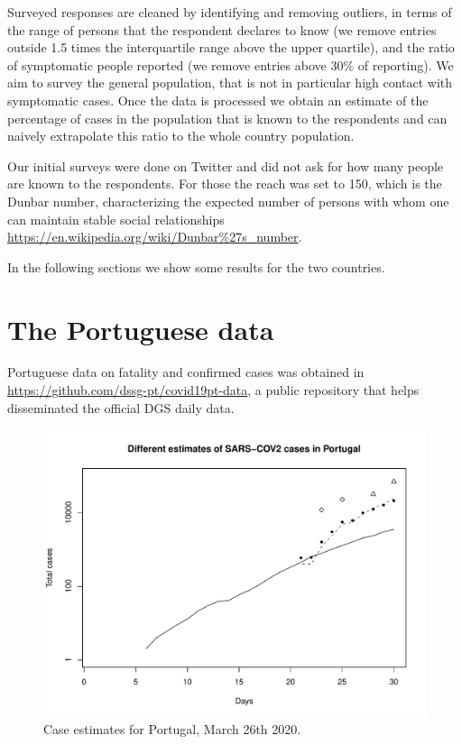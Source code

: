 \documentclass{article}
\begin{document}
Surveyed responses are cleaned by identifying and removing outliers, in terms of the range of persons that the respondent declares to know (we remove entries outside 1.5 times the interquartile range above the upper quartile), and the ratio of symptomatic people reported (we remove entries above $30\%$ of reporting). We aim to survey the general population, that is not in particular high contact with symptomatic cases. Once the data is processed we obtain an estimate of the percentage of cases in the population that is known to the respondents and can naively extrapolate this ratio to the whole country population. 


Our initial surveys were done on Twitter and did not ask for how many people are known to the respondents. For those the reach was set to 150, which is the Dunbar number, characterizing the expected number of persons with whom one can maintain stable social relationships \url{https://en.wikipedia.org/wiki/Dunbar%27s_number}. 

In the following sections we show some results for the two countries. 

\section{The Portuguese data}

Portuguese data on fatality and confirmed cases was obtained in \url{https://github.com/dssg-pt/covid19pt-data}, a public repository that helps disseminated the official DGS daily data.

\begin{figure}
\begin{center}
\includegraphics[width=.9\linewidth]{EstPTMar26.pdf}
\end{center}
\caption{Case estimates for Portugal, March 26th 2020.}
\label{pt}
\end{figure}
\end{document}
